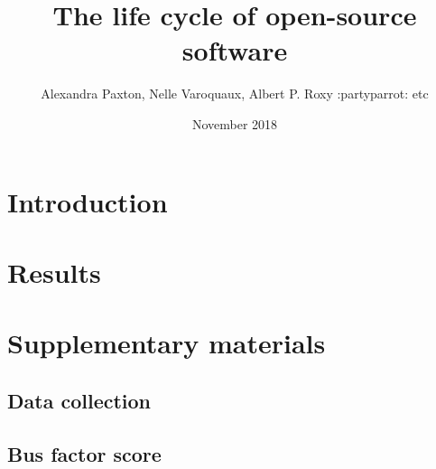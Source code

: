 \documentclass{article}
\title{The life cycle of open-source software}
\author{Alexandra Paxton, Nelle Varoquaux, Albert P. Roxy :partyparrot: etc}
\date{November 2018}
\begin{document}
\maketitle

\begin{abstract}

\end{abstract}



\section{Introduction}

\section{Results}

\section{Supplementary materials}
\subsection{Data collection}

\subsection{Bus factor score}
\end{document}
